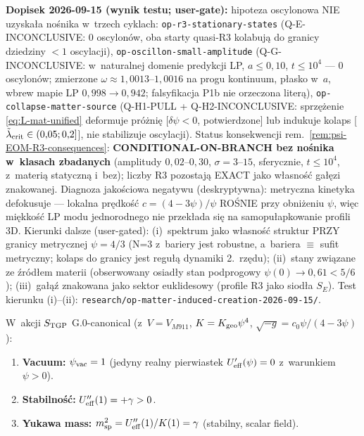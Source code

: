 \begin{remark}
\textbf{Dopisek 2026-09-15 (wynik testu; user-gate):} hipoteza
oscylonowa NIE uzyska\l{}a no\'snika w~trzech cyklach:
\texttt{op-r3-stationary-states} (Q-E-INCONCLUSIVE: 0 oscylon\'ow,
oba starty quasi-R3 kolabuj\k{a} do granicy dziedziny $<1$ oscylacji),
\texttt{op-oscillon-small-amplitude} (Q-G-INCONCLUSIVE: w~naturalnej
domenie predykcji LP, $a\le0{,}10$, $t\le10^4$ --- 0 oscylon\'ow;
zmierzone $\omega\approx1{,}0013$--$1{,}0016$ na progu kontinuum,
p\l{}asko w~$a$, wbrew mapie LP $0{,}998\to0{,}942$; falsyfikacja
P1b nie orzeczona liter\k{a}),
\texttt{op-collapse-matter-source} (Q-H1-PULL + Q-H2-INCONCLUSIVE:
sprz\k{e}\.zenie \eqref{eq:L-mat-unified} deformuje pr\'o\.zni\k{e}
[$\delta\psi<0$, potwierdzone] lub indukuje kolaps
[$\tilde\lambda_{\rm crit}\in(0{,}05;0{,}2]$], nie stabilizuje
oscylacji). Status konsekwencji
rem.~\ref{rem:psi-EOM-R3-consequences}: \textbf{CONDITIONAL-ON-BRANCH
bez no\'snika w~klasach zbadanych} (amplitudy $0{,}02$--$0{,}30$,
$\sigma=3$--$15$, sferycznie, $t\le10^4$, z~materi\k{a} statyczn\k{a}
i~bez); liczby R3 pozostaj\k{a} EXACT jako w\l{}asno\'s\'c
ga\l{}\k{e}zi znakowanej. Diagnoza jako\'sciowa negatywu
(deskryptywna): metryczna kinetyka defokusuje --- lokalna
pr\k{e}dko\'s\'c $c=(4-3\psi)/\psi$ RO\'SNIE przy obni\.zeniu
$\psi$, wi\k{e}c mi\k{e}kko\'s\'c LP modu jednorodnego nie
przek\l{}ada si\k{e} na samopu\l{}apkowanie profili 3D.
Kierunki dalsze (user-gated): (i)~spektrum jako w\l{}asno\'s\'c
struktur PRZY granicy metrycznej $\psi=4/3$ (N=3 z~bariery jest
robustne, a~bariera $\equiv$ sufit metryczny; kolaps do granicy
jest regu\l{}\k{a} dynamiki 2.~rz\k{e}du); (ii)~stany zwi\k{a}zane
ze \'zr\'od\l{}em materii (obserwowany osiad\l{}y stan podprogowy
$\psi(0)\to0{,}61<5/6$); (iii)~ga\l{}\k{a}\'z znakowana jako sektor
euklidesowy (profile R3 jako siod\l{}a $S_E$). Test kierunku
(i)--(ii): \texttt{research/op-matter-induced-creation-2026-09-15/}.
\end{remark}

\begin{proposition}%
\label{prop:vacuum-stability-G0}
W~akcji $S_{\rm TGP}$ G.0-canonical (z~$V = V_{M911}$, $K = K_{\rm geo}\psi^4$,
$\sqrt{-g} = c_0\psi/(4-3\psi)$):
\begin{enumerate}[nosep]
  \item \textbf{Vacuum:} $\psi_{\rm vac} = 1$ (jedyny realny pierwiastek
    $U_{\rm eff}'(\psi) = 0$ z~warunkiem $\psi > 0$).
  \item \textbf{Stabilno\'s\'c:} $U_{\rm eff}''(1) = +\gamma > 0$.
  \item \textbf{Yukawa mass:} $m_{\rm sp}^2 = U_{\rm eff}''(1)/K(1) = \gamma$
    (stabilny, scalar field).
\end{enumerate}
\end{proposition}

